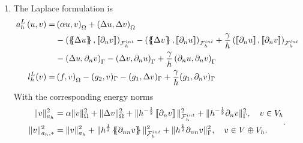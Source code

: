 \begin{enumerate}[label=\arabic*)]
\item The Laplace formulation is
    \begin{equation}
        \label{eq:cip_laplace_form}
        \begin{split}
            a_{h}^{L} \left( u, v \right)   =&
            \left( \alpha  u, v \right) _{\Omega }   +  \left( \Delta  u, \Delta v \right) _{ \Omega } \\
                                             & - \left( \mean{  \Delta  u }, \jump{ \partial _{n }v} \right)_{\mathcal{F}_{h}^{int}  }  - \left( \mean{ \Delta  v }, \jump{ \partial _{n}u }      \right)_{\mathcal{F}_{h}^{int}  }  + \frac{\gamma }{h}
                                             \left( \jump{ \partial _{n} u}, \jump{ \partial _{n} v   }   \right)_{\mathcal{F}_{h}^{int} } \\
                                             & - \left(   \Delta  u ,  \partial _{n }v \right)_{\Gamma   }  - \left(  \Delta  v ,  \partial _{n}u       \right)_{\Gamma  }  + \frac{\gamma }{h}  \left(  \partial _{n} u,  \partial _{n} v      \right)_{ \Gamma } \\
                                             l^{L}_{h}( v)  =&  \left( f, v \right) _{\Omega } - ( g_{2},  v )_{\Gamma } -  ( g_{1}, \Delta  v  )_{\Gamma }  + \frac{\gamma }{h} ( g_{1}, \partial _{n} v  )_{\Gamma }
                                         \end{split}
                                     \end{equation}
                                     With the corresponding energy norms
                                     \begin{equation}
                                         \label{eq:a_cip_energy_norm_lap}
                                         \begin{split}
                                             \| v \|_{ a_{h} }^{ 2 }& = \alpha \| v\|_{ \Omega  }^{2  }  +  \| \Delta   v \|_{ \Omega   }^{ 2 }  + \|  h^{-\frac{1}{2}} \left[\!\left[  \partial _{n} v     \right]\!\right]\|_{  \mathcal{F} _{h}^{int} }^{2  } +  \|  h^{-\frac{1}{2}}
                                             \partial _{n} v  \|_{  \Gamma  }^{2  },  \quad v \in V_{h}  \\
                                             \| v \|_{ a_{h},* }^{ 2 } &= \| v \|_{ a_{h} }^{ 2 }  + \| h^{\frac{1}{2}}  \left\{\!\!\left\{     \partial _{nn } v\right\}\!\!\right\}  \|_{ \mathcal{F}_{h}^{int}   }^{  2}+ \| h^{\frac{1}{2}}       \partial _{nn } v  \|_{ \Gamma    }^{  2}, \quad  v\in V \oplus V_{h}.
                                         \end{split}
                                         .
                                     \end{equation}


\end{enumerate}

